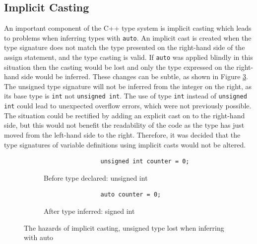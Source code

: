 \documentclass[bsc,frontabs,singlespacing,twoside,parskip,deptreport]{infthesis}
\begin{document}

\subsection{Implicit Casting} \label{sect:con-impl-cast}
An important component of the C++ type system is implicit casting which leads to problems when inferring types with \texttt{auto}. An implicit cast is created when the type signature does not match the type presented on the right-hand side of the assign statement, and the type casting is valid. If \texttt{auto} was applied blindly in this situation then the casting would be lost and only the type expressed on the right-hand side would be inferred. These changes can be subtle, as shown in Figure \ref{fig:implicit-cast}. The unsigned type signature will not be inferred from the integer on the right, as its base type is \texttt{int} not \texttt{unsigned int}. The use of type \texttt{int} instead of \texttt{unsigned int} could lead to unexpected overflow errors, which were not previously possible. The situation could be rectified by adding an explicit cast on to the right-hand side, but this would not benefit the readability of the code as the type has just moved from the left-hand side to the right. Therefore, it was decided that the type signatures of variable definitions using implicit casts would not be altered.

\begin{figure}[!h]
    \centering
    \begin{subfigure}[h]{\textwidth}
        \centering
        \begin{verbatim}
                unsigned int counter = 0;
        \end{verbatim}
        \caption{Before type declared: unsigned int}
        \label{fig:implicit-cast-before}
        \vspace{0.40cm}
    \end{subfigure}
    \begin{subfigure}[h]{\textwidth}
        \centering
        \begin{verbatim}
                auto counter = 0; 
        \end{verbatim}
        \caption{After type inferred: signed int}
        \label{fig:implicit-cast-after}
    \end{subfigure}
    \caption{The hazards of implicit casting, unsigned type lost when inferring with auto}
    \label{fig:implicit-cast}
\end{figure}
\end{document}
